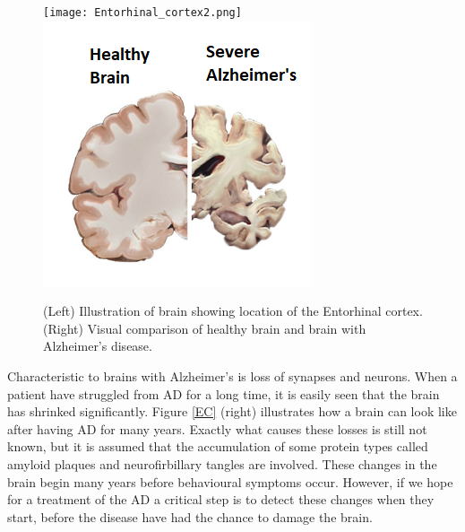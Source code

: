 \begin{figure}[h]
    \caption{(Left) Illustration of brain showing location of the Entorhinal cortex. (Right) Visual comparison of healthy brain and brain with Alzheimer's disease.}
    \label{EC}
    \centering
    \texttt{[image: Entorhinal\_cortex2.png]}
    \includegraphics[scale=0.8]{fig/Alzheimers_picture.png}    
    \label{brain}
\end{figure} 

Characteristic to brains with Alzheimer's is loss of synapses and neurons. When a patient have struggled from AD for a long time, it is easily seen that the brain has shrinked significantly. Figure \ref{EC} (right) illustrates how a brain can look like after having AD for many years. Exactly what causes these losses is still not known, but it is assumed that the accumulation of some protein types called amyloid plaques and neurofirbillary tangles are involved. These changes in the brain begin many years before behavioural symptoms occur. However, if we hope for a treatment of the AD a critical step is to detect these changes when they start, before the disease have had the chance to damage the brain.





